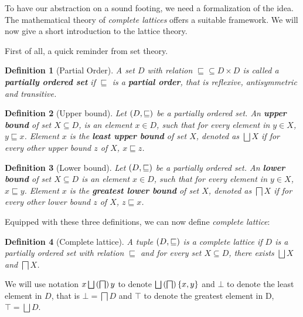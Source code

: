 \documentclass[..thesis.tex]{subfiles}
\newtheorem{defin}{Definition}[section]
\begin{document}

To have our abstraction on a sound footing, we need a formalization of the idea. The mathematical  theory of \textit{complete lattices} offers a suitable framework. We will now give a short introduction to the lattice theory.


First of all, a quick reminder from set theory.

\begin{defin}[Partial Order]
A set $D$ with relation $\sqsubseteq \subseteq D \times D$ is called a \textbf{partially ordered set} if $\sqsubseteq$ is a \textbf{partial order}, that is reflexive, antisymmetric and transitive.
\end{defin}

\begin{defin}[Upper bound]
Let $\left( D, \sqsubseteq \right)$ be a partially ordered set. An \textbf{upper bound} of set $X \subseteq D$,  is an element $x \in D$, such that for every element in $y \in X$, $y \sqsubseteq x$. Element $x$ is the \textbf{least upper bound} of set $X$, denoted as $\bigsqcup X$ if for every other upper bound $z$ of $X$, $x \sqsubseteq z$.  
\end{defin}

\begin{defin}[Lower bound]
Let $\left( D, \sqsubseteq \right)$ be a partially ordered set. An \textbf{lower bound} of set $X \subseteq D$  is an element $x \in D$, such that for every element in $y \in X$, $x \sqsubseteq y$. Element $x$ is the \textbf{greatest lower bound} of set $X$, denoted as $\bigsqcap X$ if for every other lower bound $z$ of $X$, $z \sqsubseteq x$.    
\end{defin}

Equipped with these three definitions, we can now define \textit{complete lattice}:

\begin{defin}[Complete lattice]
A tuple $\left( D, \sqsubseteq \right)$ is a complete lattice if $D$ is a partially ordered set with relation $\sqsubseteq$ and for every set $X \subseteq D$, there exists $\bigsqcup X$ and $\bigsqcap X$.
\end{defin}


We will use notation $x \bigsqcup \lp  \bigsqcap \rp y$ to denote $\bigsqcup \lp \bigsqcap \rp \lb x, y \rb$ and $\bot$ to denote the least element in $D$, that is $\bot = \bigsqcap D$ and $\top$ to denote the greatest element in D, $\top = \bigsqcup D$.
\end{document}
